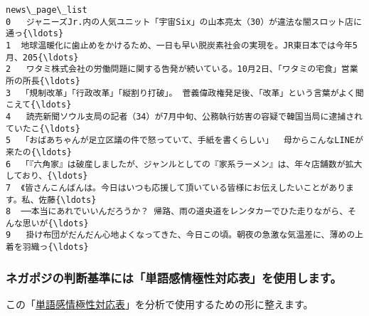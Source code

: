 \documentclass[11pt]{article}
\begin{document}
\begin{tcolorbox}[breakable, size=fbox, boxrule=.5pt, pad at break*=1mm, opacityfill=0]
\begin{Verbatim}[commandchars=\\\{\}]
                                      news\_page\_list
0   ジャニーズJr.内の人気ユニット「宇宙Six」の山本亮太（30）が違法な闇スロット店に通っ{\ldots}
1  地球温暖化に歯止めをかけるため、一日も早い脱炭素社会の実現を。JR東日本では今年5月、205{\ldots}
2   ワタミ株式会社の労働問題に関する告発が続いている。10月2日、「ワタミの宅食」営業所の所長{\ldots}
3  「規制改革」「行政改革」「縦割り打破」。 菅義偉政権発足後、「改革」という言葉がよく聞こえて{\ldots}
4   読売新聞ソウル支局の記者（34）が7月中旬、公務執行妨害の容疑で韓国当局に逮捕されていたこ{\ldots}
5  「おばあちゃんが足立区議の件で怒っていて、手紙を書くらしい」  母からこんなLINEが来たの{\ldots}
6  「『六角家』は破産しましたが、ジャンルとしての『家系ラーメン』は、年々店舗数が拡大しており、{\ldots}
7  《皆さんこんばんは。今日はいつも応援して頂いている皆様にお伝えしたいことがあります。私、佐藤{\ldots}
8  ──本当にあれでいいんだろうか？ 帰路、雨の道央道をレンタカーでひた走りながら、そんな思いが{\ldots}
9   掛け布団がだんだん心地よくなってきた、今日この頃。朝夜の急激な気温差に、薄めの上着を羽織っ{\ldots}
\end{Verbatim}
\end{tcolorbox}
        
    \hypertarget{ux30cdux30acux30ddux30b8ux306eux5224ux65adux57faux6e96ux306bux306fux5358ux8a9eux611fux60c5ux6975ux6027ux5bfeux5fdcux8868ux3092ux4f7fux7528ux3057ux307eux3059}{%
\subsubsection{ネガポジの判断基準には「単語感情極性対応表」を使用します。}\label{ux30cdux30acux30ddux30b8ux306eux5224ux65adux57faux6e96ux306bux306fux5358ux8a9eux611fux60c5ux6975ux6027ux5bfeux5fdcux8868ux3092ux4f7fux7528ux3057ux307eux3059}}

この「\href{http://www.lr.pi.titech.ac.jp/~takamura/pndic_ja.html}{単語感情極性対応表}」を分析で使用するための形に整えます。
\end{document}
